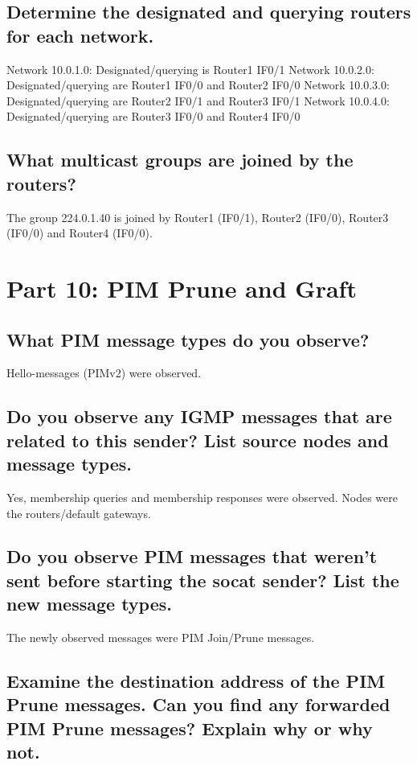 \documentclass[a4paper, 11pt]{article}
\begin{document}
\subsection{Determine the designated and querying routers for each network.}


Network 10.0.1.0: Designated/querying is Router1 IF0/1
Network 10.0.2.0: Designated/querying are Router1 IF0/0 and Router2 IF0/0
Network 10.0.3.0: Designated/querying are Router2 IF0/1 and Router3 IF0/1
Network 10.0.4.0: Designated/querying are Router3 IF0/0 and Router4 IF0/0

\subsection{What multicast groups are joined by the routers?}

The group 224.0.1.40 is joined by Router1 (IF0/1), Router2 (IF0/0), Router3 (IF0/0) and Router4 (IF0/0).

\section{Part 10: PIM Prune and Graft}

\subsection{What PIM message types do you observe?}

Hello-messages (PIMv2) were observed.

\subsection{Do you observe any IGMP messages that are related to this sender? List source nodes and message types.}

Yes, membership queries and membership responses were observed. Nodes were the routers/default gateways.

\subsection{Do you observe PIM messages that weren't sent before starting the socat sender? List the new message types.}

The newly observed messages were PIM Join/Prune messages.

\subsection{Examine the destination address of the PIM Prune messages. Can you find any forwarded PIM Prune messages? Explain why or why not.}
\end{document}
